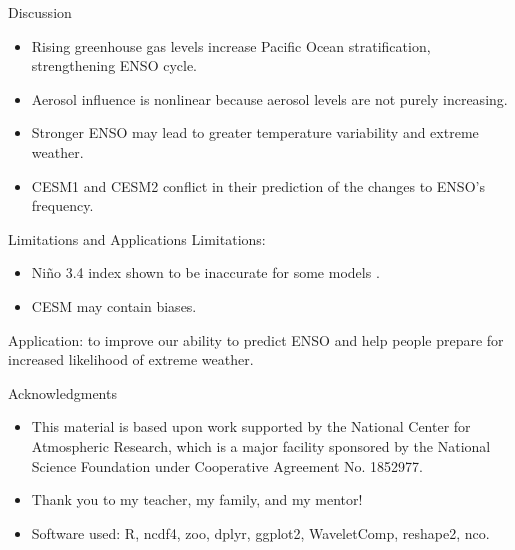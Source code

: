 \documentclass{beamer}
\begin{document}

\begin{frame}{Discussion}
  \begin{itemize}
  \item Rising greenhouse gas levels increase Pacific Ocean stratification, strengthening ENSO cycle.
  \item Aerosol influence is nonlinear because aerosol levels are not purely increasing.
  \item Stronger ENSO may lead to greater temperature variability and extreme weather.
  \item CESM1 and CESM2 conflict in their prediction of the changes to ENSO's frequency.
  \end{itemize}
\end{frame}

\begin{frame}{Limitations and Applications}
  Limitations:
  \begin{itemize}
  \item Niño 3.4 index shown to be inaccurate for some models \citep{cai2018increased}.
  \item CESM may contain biases.
  \end{itemize}
  Application: to improve our ability to predict ENSO and help people prepare for increased likelihood of extreme weather.
\end{frame}

\begin{frame}{Acknowledgments}
  \begin{itemize}
  \item This material is based upon work supported by the National Center for Atmospheric Research, which is a major facility sponsored by the National Science Foundation under Cooperative Agreement No. 1852977.
  \item Thank you to my teacher, my family, and my mentor!
  \item Software used: R, ncdf4, zoo, dplyr, ggplot2, WaveletComp, reshape2, nco.
  \end{itemize}
\end{frame}
\end{document}

